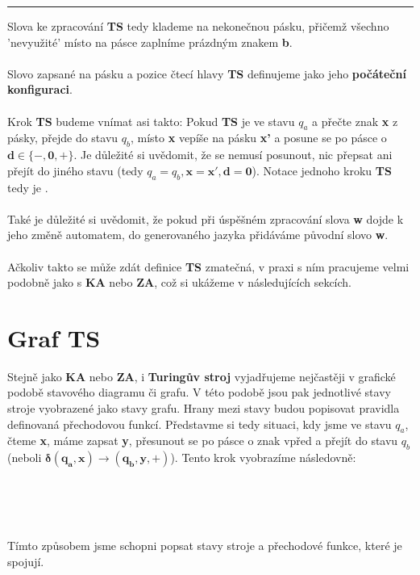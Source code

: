 \documentclass{report}
\begin{document}
\vspace{0.1cm}    
\hrule
\vspace{0.4cm}  
Slova ke zpracování \textbf{TS} tedy klademe na nekonečnou pásku, přičemž všechno 'nevyužité' místo na pásce zaplníme prázdným znakem \textbf{b}.\\ \\
Slovo zapsané na pásku a pozice čtecí hlavy \textbf{TS} definujeme jako jeho \textbf{počáteční konfiguraci}.\\ \\
Krok \textbf{TS} budeme vnímat asi takto: Pokud \textbf{TS} je ve stavu $q_a$ a přečte znak \textbf{x} z pásky, přejde do stavu $q_b$, místo \textbf{x} vepíše na pásku \textbf{x'} a posune se po pásce o $\mathbf{d \in \{-,0,+\}}$. Je důležité si uvědomit, že se nemusí posunout, nic přepsat ani přejít do jiného stavu (tedy $q_a=q_b,\mathbf{x=x'},\mathbf{d=0}$). Notace jednoho kroku \textbf{TS} tedy je .\\ \\
Také je důležité si uvědomit, že pokud při úspěšném zpracování slova \textbf{w} dojde k jeho změně automatem, do generovaného jazyka přidáváme původní slovo \textbf{w}.\\ \\
Ačkoliv takto se může zdát definice \textbf{TS} zmatečná, v praxi s ním pracujeme velmi podobně jako s \textbf{KA} nebo \textbf{ZA}, což si ukážeme v následujících sekcích.
\section{Graf TS}
Stejně jako \textbf{KA} nebo \textbf{ZA}, i \textbf{Turingův stroj} vyjadřujeme nejčastěji v grafické podobě stavového diagramu či grafu. V této podobě jsou pak jednotlivé stavy stroje vyobrazené jako stavy grafu. Hrany mezi stavy budou popisovat pravidla definovaná přechodovou funkcí. Představme si tedy situaci, kdy jsme ve stavu $q_a$, čteme \textbf{x}, máme zapsat \textbf{y}, přesunout se po pásce o znak vpřed a přejít do stavu $q_b$ (neboli $\mathbf{\delta(q_a,x) \rightarrow (q_b,y,+)}$). Tento krok vyobrazíme následovně:\\ \\
\begin{center}
\\ \\
\end{center}
Tímto způsobem jsme schopni popsat stavy stroje a přechodové funkce, které je spojují.
\end{document}
